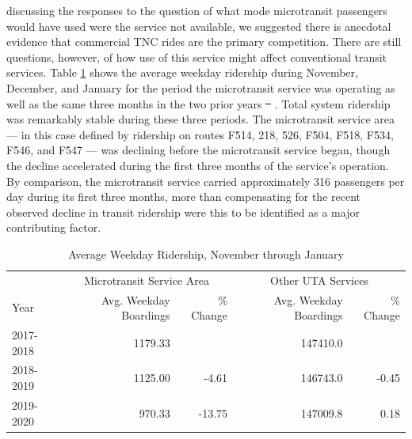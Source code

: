 \documentclass[smartcities,article,submit,moreauthors,pdftex]{Definitions/mdpi}
\providecommand{\DIFadd}[1]{{\protect\color{blue}\uwave{#1}}} %
\providecommand{\DIFdel}[1]{{\protect\color{red}\sout{#1}}}                      %
\providecommand{\DIFaddbegin}{} %
\providecommand{\DIFaddend}{} %
\providecommand{\DIFdelbegin}{} %
\providecommand{\DIFdelend}{} %
\begin{document}
\DIFadd{In }\DIFaddend discussing the responses to the question of what mode microtransit passengers would have used were the service not available, we suggested there is anecdotal evidence that commercial TNC rides are the primary competition. There are still questions, however, of how use of this \DIFaddbegin \DIFadd{microtransit }\DIFaddend service might affect conventional transit services. Table \ref{tab:uta-ridership} shows the average weekday ridership during November, December, and January for the period the microtransit service was operating as well as the same three months in the two prior years \DIFdelbegin \DIFdel{\mbox{%
\citet{uta2020boardings}}\hspace{0pt}%
}\DIFdelend \DIFaddbegin \DIFadd{\mbox{%
\citep{uta2020boardings}}\hspace{0pt}%
}\DIFaddend . Total system ridership was remarkably stable during these three periods. The microtransit service area --- in this case defined by ridership on routes F514, 218, 526, F504, F518, F534, F546, and F547 --- was declining before the microtransit service began, though the decline accelerated during the first three months of the service’s operation. By comparison, the microtransit service carried approximately 316 passengers per day during its first three months, more than compensating for the recent observed decline in transit ridership were this to be identified as a major contributing factor.


\begin{table}[ht]
    \centering
    \caption{Average Weekday Ridership, November through January}
    \label{tab:uta-ridership}
    \begin{tabular}[t]{lrrrr}
\toprule
\multicolumn{1}{c}{ } & \multicolumn{2}{c}{Microtransit Service Area} & \multicolumn{2}{c}{Other UTA Services} \\
\cmidrule(l{3pt}r{3pt}){2-3} \cmidrule(l{3pt}r{3pt}){4-5}
Year & Avg. Weekday Boardings & \% Change & Avg. Weekday Boardings & \% Change\\
\midrule
2017-2018 & 1179.33 &  & 147410.0 & \\
2018-2019 & 1125.00 & -4.61 & 146743.0 & -0.45\\
2019-2020 & 970.33 & -13.75 & 147009.8 & 0.18\\
\bottomrule
\end{tabular}
\end{table}
\end{document}
